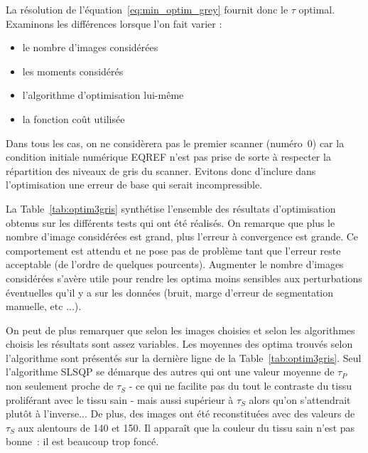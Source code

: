 \documentclass[main.tex]{subfiles}
\begin{document}
La résolution de l'équation~\eqref{eq:min_optim_grey} fournit donc le $\tau$ optimal. Examinons les différences lorsque l'on fait varier :
\begin{itemize}
\item le nombre d'images considérées
\item les moments considérés
\item l'algorithme d'optimisation lui-même
\item la fonction coût utilisée
\end{itemize}

Dans tous les cas, on ne considèrera pas le premier scanner (numéro~0) car la condition initiale numérique EQREF  n'est pas prise de sorte à respecter la répartition des niveaux de gris du scanner. Evitons donc d'inclure dans l'optimisation une erreur de base qui serait incompressible.


La Table~\ref{tab:optim3gris} synthétise l'ensemble des résultats d'optimisation obtenus sur les différents tests qui ont été réalisés. 
On remarque que plus le nombre d'image considérées est grand, plus l'erreur à convergence est grande. Ce comportement est attendu et ne pose pas de problème tant que l'erreur reste acceptable (de l'ordre de quelques pourcents). Augmenter le nombre d'images considérées s'avère utile pour rendre les optima moins sensibles aux perturbations éventuelles qu'il y a sur les données (bruit, marge d'erreur de segmentation manuelle, etc ...).


On peut de plus remarquer que selon les images choisies et selon les algorithmes choisis les résultats sont assez variables. Les moyennes des optima trouvés selon l'algorithme sont présentés sur la dernière ligne de la Table~\ref{tab:optim3gris}. Seul l'algorithme SLSQP se démarque des autres qui ont une valeur moyenne de $\tau_P$ non seulement proche de $\tau_S$ - ce qui ne facilite pas du tout le contraste du tissu proliférant avec le tissu sain - mais aussi supérieur à $\tau_S$ alors qu'on s'attendrait plutôt à l'inverse... De plus, des images ont été reconstituées avec des valeurs de $\tau_S$ aux alentours de 140 et 150. Il apparaît que la couleur du tissu sain n'est pas bonne~: il est beaucoup trop foncé.
\end{document}
